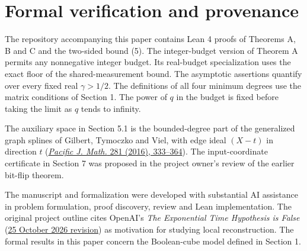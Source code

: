 \documentclass[
  10pt,
]{article}
\begin{document}
\section*{Formal verification and provenance}
The repository accompanying this paper contains Lean 4 proofs of Theorems A, B and C and the two-sided bound (5). The integer-budget version of Theorem A permits any nonnegative integer budget. Its real-budget specialization uses the exact floor of the shared-measurement bound. The asymptotic assertions quantify over every fixed real \(\gamma>1/2\).
The definitions of all four minimum degrees use the matrix conditions of Section 1.
The power of \(q\) in the budget is fixed before taking the limit as \(q\) tends to infinity.

The auxiliary space in Section 5.1 is the bounded-degree part of the generalized graph splines of Gilbert, Tymoczko and Viel, with edge ideal \((X-t)\) in direction \(t\) (\href{https://doi.org/10.2140/pjm.2016.281.333}{\emph{Pacific J. Math.} 281 (2016), 333--364}). The input-coordinate certificate in Section 7 was proposed in the project owner's review of the earlier bit-flip theorem.

The manuscript and formalization were developed with substantial AI assistance in problem formulation, proof discovery, review and Lean implementation. The original project outline cites OpenAI's \emph{The Exponential Time Hypothesis is False} (\href{https://github.com/openai/math/tree/main/preprints/The-Exponential-Time-Hypothesis-is-False-October-25-2026}{25 October 2026 revision}) as motivation for studying local reconstruction. The formal results in this paper concern the Boolean-cube model defined in Section 1.
\end{document}

